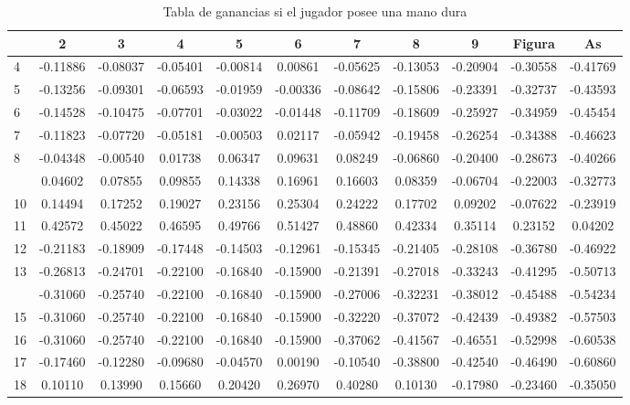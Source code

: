 \documentclass[12pt,a4paper,]{book}
\numberwithin{dummy}{section}
\theoremstyle{ocrenumbox}
\theoremstyle{blacknumex}
\theoremstyle{blacknumbox}
\theoremstyle{ocrenum}
\theoremstyle{ocrenum}
\begin{document}
\begin{longtable}[t]{lcccccccccc}
\caption{\label{tab:unnamed-chunk-4}Tabla de ganancias si el jugador posee una mano dura}\\
\toprule
 & 2 & 3 & 4 & 5 & 6 & 7 & 8 & 9 & Figura & As\\
\midrule
4 & -0.11886 & -0.08037 & -0.05401 & -0.00814 & 0.00861 & -0.05625 & -0.13053 & -0.20904 & -0.30558 & -0.41769\\
5 & -0.13256 & -0.09301 & -0.06593 & -0.01959 & -0.00336 & -0.08642 & -0.15806 & -0.23391 & -0.32737 & -0.43593\\
6 & -0.14528 & -0.10475 & -0.07701 & -0.03022 & -0.01448 & -0.11709 & -0.18609 & -0.25927 & -0.34959 & -0.45454\\
7 & -0.11823 & -0.07720 & -0.05181 & -0.00503 & 0.02117 & -0.05942 & -0.19458 & -0.26254 & -0.34388 & -0.46623\\
8 & -0.04348 & -0.00540 & 0.01738 & 0.06347 & 0.09631 & 0.08249 & -0.06860 & -0.20400 & -0.28673 & -0.40266\\
\addlinespace
9 & 0.04602 & 0.07855 & 0.09855 & 0.14338 & 0.16961 & 0.16603 & 0.08359 & -0.06704 & -0.22003 & -0.32773\\
10 & 0.14494 & 0.17252 & 0.19027 & 0.23156 & 0.25304 & 0.24222 & 0.17702 & 0.09202 & -0.07622 & -0.23919\\
11 & 0.42572 & 0.45022 & 0.46595 & 0.49766 & 0.51427 & 0.48860 & 0.42334 & 0.35114 & 0.23152 & 0.04202\\
12 & -0.21183 & -0.18909 & -0.17448 & -0.14503 & -0.12961 & -0.15345 & -0.21405 & -0.28108 & -0.36780 & -0.46922\\
13 & -0.26813 & -0.24701 & -0.22100 & -0.16840 & -0.15900 & -0.21391 & -0.27018 & -0.33243 & -0.41295 & -0.50713\\
\addlinespace
14 & -0.31060 & -0.25740 & -0.22100 & -0.16840 & -0.15900 & -0.27006 & -0.32231 & -0.38012 & -0.45488 & -0.54234\\
15 & -0.31060 & -0.25740 & -0.22100 & -0.16840 & -0.15900 & -0.32220 & -0.37072 & -0.42439 & -0.49382 & -0.57503\\
16 & -0.31060 & -0.25740 & -0.22100 & -0.16840 & -0.15900 & -0.37062 & -0.41567 & -0.46551 & -0.52998 & -0.60538\\
17 & -0.17460 & -0.12280 & -0.09680 & -0.04570 & 0.00190 & -0.10540 & -0.38800 & -0.42540 & -0.46490 & -0.60860\\
18 & 0.10110 & 0.13990 & 0.15660 & 0.20420 & 0.26970 & 0.40280 & 0.10130 & -0.17980 & -0.23460 & -0.35050\\

\end{longtable}
\end{document}

